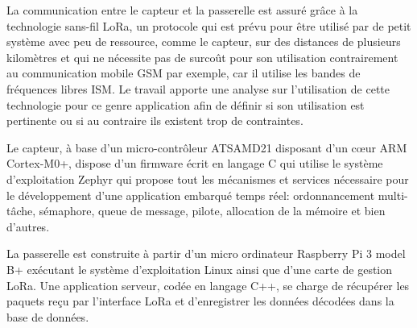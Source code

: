\begin{normalsize}
La communication entre le capteur et la passerelle est assuré grâce à la technologie sans-fil LoRa, un protocole qui est prévu pour être utilisé par de petit système avec peu de ressource, comme le capteur, sur des distances de plusieurs kilomètres et qui ne nécessite pas de surcoût pour son utilisation contrairement au communication mobile GSM par exemple, car il utilise les bandes de fréquences libres ISM. Le travail apporte une analyse sur l'utilisation de cette technologie pour ce genre application afin de définir si son utilisation est pertinente ou si au contraire ils existent trop de contraintes.

Le capteur, à base d'un micro-contrôleur ATSAMD21 disposant d'un cœur ARM Cortex-M0+, dispose d'un firmware écrit en langage C qui utilise le système d'exploitation Zephyr qui propose tout les mécanismes et services nécessaire pour le développement d'une application embarqué temps réel: ordonnancement multi-tâche, sémaphore, queue de message, pilote, allocation de la mémoire et bien d'autres.

La passerelle est construite à partir d'un micro ordinateur Raspberry Pi 3 model B+ exécutant le système d'exploitation Linux ainsi que d'une carte de gestion LoRa. Une application serveur, codée en langage C++, se charge de récupérer les paquets reçu par l'interface LoRa et d'enregistrer les données décodées dans la base de données.

\end{normalsize}

